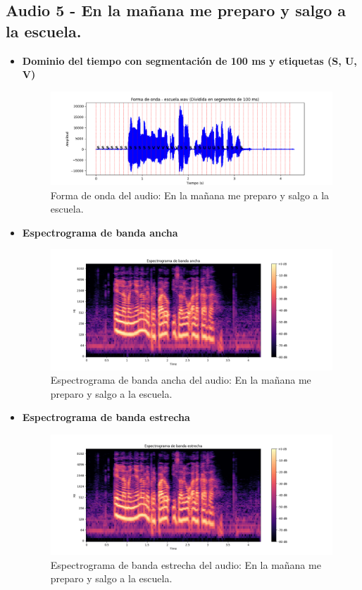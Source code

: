 \documentclass{report}
\begin{document}
\newpage

\subsection{Audio 5 - En la mañana me preparo y salgo a la escuela.}
\begin{itemize}
    \item \textbf{Dominio del tiempo con segmentación de 100 ms y etiquetas (S, U, V)}
    \begin{figure}[h]
        \centering
        \includegraphics[width=\linewidth]{a5.png}
        \caption{Forma de onda del audio: En la mañana me preparo y salgo a la escuela.}
        \label{fig:forma_onda_audio5div}
    \end{figure}
    \item \textbf{Espectrograma de banda ancha}
    \begin{figure}[h]
        \centering
        \includegraphics[width=\linewidth]{ancha5.png}
        \caption{Espectrograma de banda ancha del audio: En la mañana me preparo y salgo a la escuela.}
        \label{fig:espectograma banda ancha audio5}
    \end{figure}
    \newpage
    \item \textbf{Espectrograma de banda estrecha}
    \begin{figure}[h]
        \centering
        \includegraphics[width=\linewidth]{estrecha5.png}
        \caption{Espectrograma de banda estrecha del audio: En la mañana me preparo y salgo a la escuela.}
        \label{fig:espectograma banda estrecha audio5}
    \end{figure}
\end{itemize}
\newpage
\end{document}
